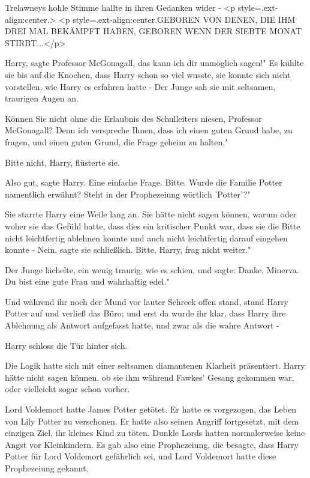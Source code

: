 Trelawneys hohle Stimme hallte in ihren Gedanken wider - <p
style=\grqq{}.ext-align:center\grqq{}.> <p
style=\grqq{}.ext-align:center\grqq{}.GEBOREN VON DENEN, DIE IHM DREI MAL
BEKÄMPFT HABEN, GEBOREN WENN DER SIEBTE MONAT STIRBT...</p>


\glqq Harry\grqq{}, sagte Professor McGonagall, \glqq das kann ich dir unmöglich
sagen!" Es kühlte sie bis auf die Knochen, dass Harry schon so viel wusste, sie
konnte sich nicht vorstellen, wie Harry es erfahren hatte - Der Junge sah sie
mit seltsamen, traurigen Augen an.

\glqq Können Sie nicht ohne die Erlaubnis des Schulleiters niesen, Professor
McGonagall? Denn ich verspreche Ihnen, dass ich einen guten Grund habe, zu
fragen, und einen guten Grund, die Frage geheim zu halten."

\glqq Bitte nicht, Harry\grqq{}, flüsterte sie.

\glqq Also gut\grqq{}, sagte Harry. \glqq Eine einfache Frage. Bitte. Wurde die
Familie Potter namentlich erwähnt? Steht in der Prophezeiung wörtlich 'Potter'?"

Sie starrte Harry eine Weile lang an. Sie hätte nicht sagen können, warum oder
woher sie das Gefühl hatte, dass dies ein kritischer Punkt war, dass sie die
Bitte nicht leichtfertig ablehnen konnte und auch nicht leichtfertig darauf
eingehen konnte - \glqq Nein\grqq{}, sagte sie schließlich. \glqq Bitte, Harry,
frag nicht weiter."

Der Junge lächelte, ein wenig traurig, wie es schien, und sagte: \glqq Danke,
Minerva. Du bist eine gute Frau und wahrhaftig edel."

Und während ihr noch der Mund vor lauter Schreck offen stand, stand Harry Potter
auf und verließ das Büro; und erst da wurde ihr klar, dass Harry ihre Ablehnung
als Antwort aufgefasst hatte, und zwar als die wahre Antwort -

Harry schloss die Tür hinter sich.

Die Logik hatte sich mit einer seltsamen diamantenen Klarheit präsentiert. Harry
hätte nicht sagen können, ob sie ihm während Fawkes' Gesang gekommen war, oder
vielleicht sogar schon vorher.

Lord Voldemort hatte James Potter getötet. Er hatte es vorgezogen, das Leben von
Lily Potter zu verschonen. Er hatte also seinen Angriff fortgesetzt, mit dem
einzigen Ziel, ihr kleines Kind zu töten. Dunkle Lords hatten normalerweise
keine Angst vor Kleinkindern. Es gab also eine Prophezeiung, die besagte, dass
Harry Potter für Lord Voldemort gefährlich sei, und Lord Voldemort hatte diese
Prophezeiung gekannt.

